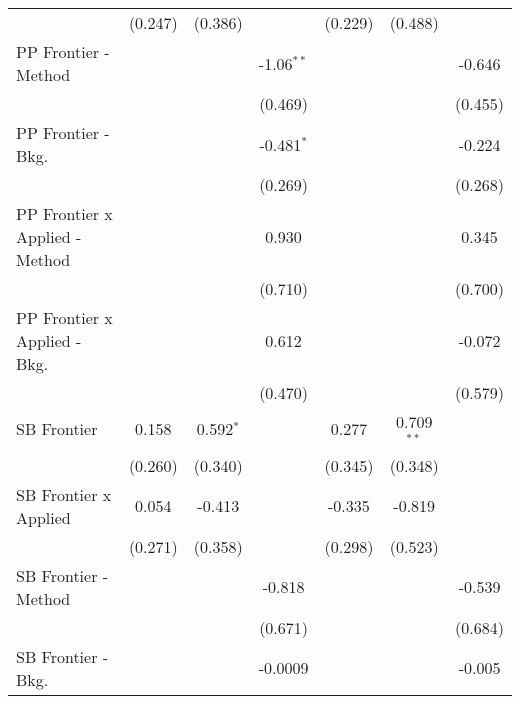 \begin{tabular}{lcccccc}
                                  & (0.247)       & (0.386)      &               & (0.229)       & (0.488)       &   \\   
   PP Frontier - Method           &               &              & -1.06$^{**}$  &               &               & -0.646\\   
                                  &               &              & (0.469)       &               &               & (0.455)\\   
   PP Frontier - Bkg.             &               &              & -0.481$^{*}$  &               &               & -0.224\\   
                                  &               &              & (0.269)       &               &               & (0.268)\\   
   PP Frontier x Applied - Method &               &              & 0.930         &               &               & 0.345\\   
                                  &               &              & (0.710)       &               &               & (0.700)\\   
   PP Frontier x Applied - Bkg.   &               &              & 0.612         &               &               & -0.072\\   
                                  &               &              & (0.470)       &               &               & (0.579)\\   
   SB Frontier                    & 0.158         & 0.592$^{*}$  &               & 0.277         & 0.709$^{**}$  &   \\   
                                  & (0.260)       & (0.340)      &               & (0.345)       & (0.348)       &   \\   
   SB Frontier x Applied          & 0.054         & -0.413       &               & -0.335        & -0.819        &   \\   
                                  & (0.271)       & (0.358)      &               & (0.298)       & (0.523)       &   \\   
   SB Frontier - Method           &               &              & -0.818        &               &               & -0.539\\   
                                  &               &              & (0.671)       &               &               & (0.684)\\   
   SB Frontier - Bkg.             &               &              & -0.0009       &               &               & -0.005\\   

\end{tabular}
